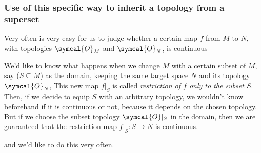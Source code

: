  \subsubsection{Use of this specific way to inherit a topology from a superset}
 Very often is very easy for us to judge whether a certain map $f$ from $M$ to $N$,
 with topologies $\symcal{O}_M$ and $\symcal{O}_N$, is continuous
 \vspace{-2ex}
 \begin{center}
   \def\scl{1}
   \centering
   \end{center}

 We'd like to know what happens when we change $M$ with a certain subset of $M$, say
 ($S\subseteq M$) as the domain, keeping the same target space $N$ and its topology
 $\symcal{O}_N$, This new map $f|_S$ is called \emph{restriction of $f$ only to the subset $S$}.
 Then, if we decide to equip $S$ with an arbitrary topology, we wouldn't know beforehand if it
 is continuous or not, because it depends on the chosen topology.
 But if we choose the subset topology $\symcal{O}|_S$ in the domain, then we are guaranteed that
 the restriction map $f|_S : S \longrightarrow N$ is continuous.
 \vspace{-1.0ex}
 \begin{center}
   \def\scl{1}
   \centering
   \end{center}
   and we'd like to do this very often.

